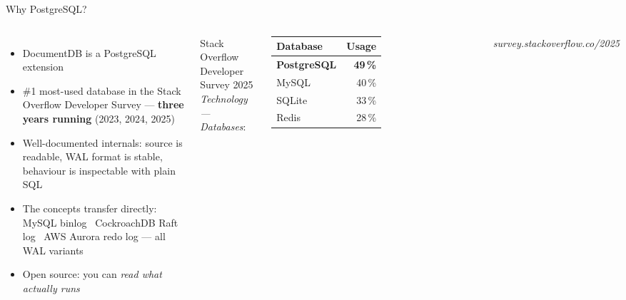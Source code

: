 \documentclass[aspectratio=169,10pt]{beamer}
\begin{document}
\begin{frame}{Why PostgreSQL?}
  \begin{columns}[T]
    \begin{itemize}
      \item DocumentDB is a PostgreSQL extension
      \item \alert{\#1 most-used database} in the Stack\,Overflow Developer
            Survey --- \textbf{three years running} (2023, 2024, 2025)
      \item Well-documented internals: source is readable, WAL format is
            stable, behaviour is inspectable with plain SQL
      \item The concepts transfer directly:\\
            MySQL binlog \textbullet\ CockroachDB Raft log \textbullet\
            AWS Aurora redo log --- all WAL variants
      \item Open source: you can \textit{read what actually runs}
    \end{itemize}

    \vspace{0.4em}
    {\footnotesize Stack\,Overflow Developer Survey 2025\\
    \textit{Technology --- Databases}:}
    \vspace{0.3em}

    \begin{tabular}{lr}
      \toprule
      \textbf{Database} & \textbf{Usage} \\
      \midrule
      \textbf{PostgreSQL} & \textbf{49\,\%} \\
      MySQL               & 40\,\% \\
      SQLite              & 33\,\% \\
      Redis               & 28\,\% \\
      \bottomrule
    \end{tabular}

    \vspace{0.3em}
    {\scriptsize\textit{survey.stackoverflow.co/2025}}
  \end{columns}
\end{frame}
\end{document}
